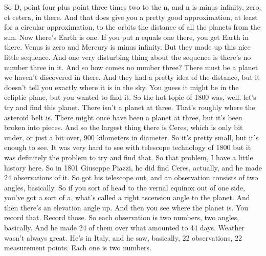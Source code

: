 \documentclass[11pt,a4paper]{article}
\begin{document}
So D, point four plus point three times two to the n, and n is minus infinity, zero, et cetera, in there. And that does give you a pretty good approximation, at least for a circular approximation, to the orbits the distance of all the planets from the sun. Now there's Earth is one. If you put n equals one there, you get Earth in there. Venus is zero and Mercury is minus infinity. But they made up this nice little sequence. And one very disturbing thing about the sequence is there's no number three in it. And so how comes no number three? There must be a planet we haven't discovered in there. And they had a pretty idea of the distance, but it doesn't tell you exactly where it is in the sky. You guess it might be in the ecliptic plane, but you wanted to find it. So the hot topic of 1800 was, well, let's try and find this planet. There isn't a planet at three. That's roughly where the asteroid belt is. There might once have been a planet at three, but it's been broken into pieces. And so the largest thing there is Ceres, which is only bit under, or just a bit over, 900 kilometers in diameter. So it's pretty small, but it's enough to see. It was very hard to see with telescope technology of 1800 but it was definitely the problem to try and find that. So that problem, I have a little history here. So in 1801 Giuseppe Piazzi, he did find Ceres, actually, and he made 24 observations of it. So got his telescope out, and an observation consists of two angles, basically. So if you sort of head to the vernal equinox out of one side, you've got a sort of a, what's called a right ascension angle to the planet. And then there's an elevation angle up. And then you see where the planet is. You record that. Record those. So each observation is two numbers, two angles, basically. And he made 24 of them over what amounted to 44 days. Weather wasn't always great. He's in Italy, and he saw, basically, 22 observations, 22 measurement points. Each one is two numbers.
\end{document}
